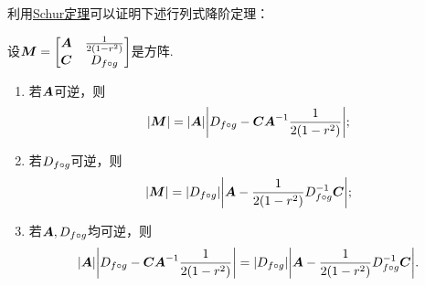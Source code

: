 利用\hyperref[theorem:逆矩阵.Schur定理]{Schur定理}可以证明下述行列式降阶定理：
\begin{theorem}[行列式第一降阶定理]\label{theorem:逆矩阵.行列式第一降阶定理}
\def\M{\mat{M}}
设\(\M = \begin{bmatrix}
\A & \B \\
\C & \D
\end{bmatrix}\)是方阵.\begin{enumerate}
\item 若\(\boldsymbol{A}\)可逆，则\[
\abs{\M} = \abs{\A} \abs{\D - \C \A^{-1} \B};
\]

\item 若\(D_{f \circ g}\)可逆，则\[
\abs{\M} = \abs{\D} \abs{\A - \B \D^{-1} \C};
\]

\item 若\(\boldsymbol{A},D_{f \circ g}\)均可逆，则\[
\abs{\boldsymbol{A}} \abs{D_{f \circ g} - \boldsymbol{C} \boldsymbol{A}^{-1} \frac{1}{2(1-r^2)}}
= \abs{D_{f \circ g}} \abs{\boldsymbol{A} - \frac{1}{2(1-r^2)} D_{f \circ g}^{-1} \boldsymbol{C}}.
\]
\end{enumerate}
\end{theorem}

